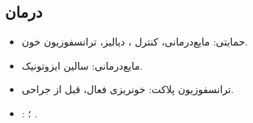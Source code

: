 \documentclass[12pt,a4paper]{article}
\begin{document}
\subsection*{درمان }
\begin{itemize}
\item حمایتی: مایع‌درمانی، کنترل ، دیالیز، ترانسفوزیون خون.
\item مایع‌درمانی: سالین ایزوتونیک.
\item ترانسفوزیون پلاکت: خونریزی فعال، قبل از جراحی.
\item {}: ؛ .
\end{itemize}

\endgroup
\ifHUSStandalone
  \expandafter\enddocument
\fi
\end{document}
